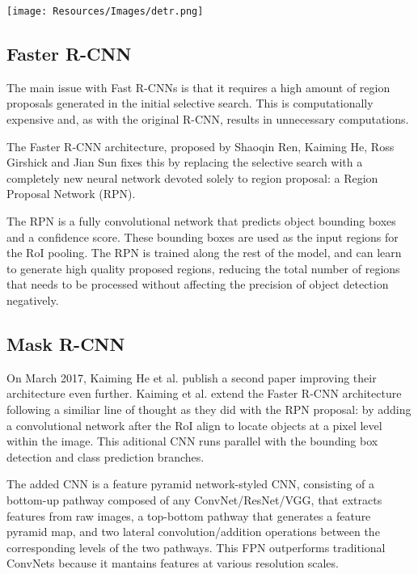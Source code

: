 \documentclass[12pt,a4paper,twocolumn,twoside]{article}
\begin{document}
\begin{figure*}[h!]    
    \centering
        \texttt{[image: Resources/Images/detr.png]}
    \label{fig:detr}
\end{figure*}

\subsection{Faster R-CNN}
The main issue with Fast R-CNNs is that it requires a high amount of region proposals generated in the initial selective search. This is computationally expensive and, as with the original R-CNN, results in unnecessary computations. 

The Faster R-CNN architecture, proposed by Shaoqin Ren, Kaiming He, Ross Girshick and Jian Sun\cite{ren_he_girshick_sun_2015} fixes this by replacing the selective search with a completely new neural network devoted solely to region proposal: a Region Proposal Network (RPN). 

The RPN is a fully convolutional network that predicts object bounding boxes and a confidence score. These bounding boxes are used as the input regions for the RoI pooling. The RPN is trained along the rest of the model, and can learn to generate high quality proposed regions, reducing the total number of regions that needs to be processed without affecting the precision of object detection negatively. 

\subsection{Mask R-CNN}
On March 2017, Kaiming He et al.\cite{he_gkioxari_dollár_girshick_2017} publish a second paper improving their architecture even further. Kaiming et al. extend the Faster R-CNN architecture following a similiar line of thought as they did with the RPN proposal: by adding a convolutional network after the RoI align to locate objects at a pixel level within the image. This aditional CNN runs parallel with the bounding box detection and class prediction branches. 

The added CNN is a feature pyramid network-styled CNN, consisting of a bottom-up pathway composed of any ConvNet/ResNet/VGG, that extracts features from raw images, a top-bottom pathway that generates a feature pyramid map, and two lateral convolution/addition operations between the corresponding levels of the two pathways. This FPN outperforms traditional ConvNets because it mantains features at various resolution scales. 
\end{document}
